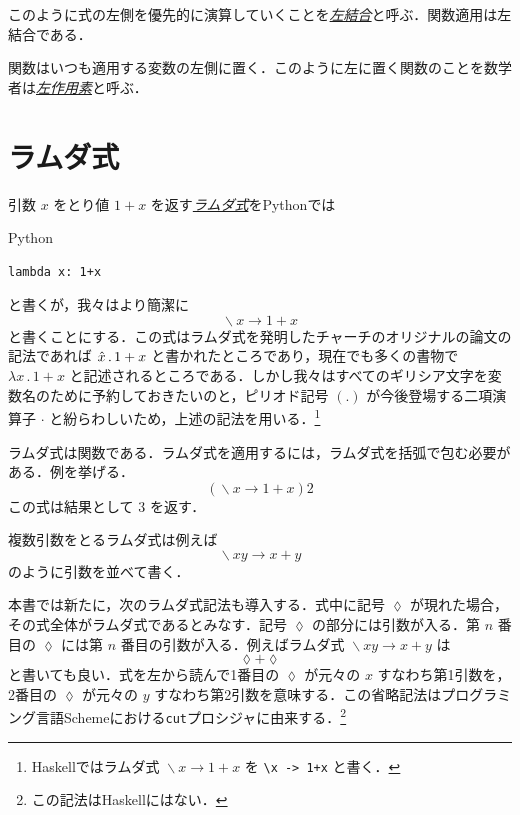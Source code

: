 \documentclass[a4paper]{jsbook}
\newcommand{\programminglanguage}[1]{\textsf{#1}}
\newcommand{\haskell}{\programminglanguage{Haskell}}
\newcommand{\python}{\programminglanguage{Python}}
\newcommand{\scheme}{\programminglanguage{Scheme}}
\newcommand{\keyword}[1]{{\underline{\emph{#1}}}}
\newcommand{\code}[1]{\texttt{#1}}
\newenvironment{pythoncode}{\begin{itembox}[r]{\python}}{\end{itembox}}
\newcommand{\mAnonParameter}{\lozenge}
\DeclareMathOperator{\mLambda}{\backslash}
\DeclareMathOperator{\mLambdaArrow}{\rightarrow}
\newcommand{\mLambdaExp}[2]{\mLambda{#1}\mLambdaArrow{#2}}
\begin{document}
このように式の左側を優先的に演算していくことを\keyword{左結合}と呼ぶ．関数適用は左結合である．

関数はいつも適用する変数の左側に置く．このように左に置く関数のことを数学者は\keyword{左作用素}と呼ぶ．

\section{ラムダ式}

引数 $x$ をとり値 $1+x$ を返す\keyword{ラムダ式}を\python では
\begin{pythoncode}
\begin{verbatim}
lambda x: 1+x
\end{verbatim}
\end{pythoncode}
と書くが，我々はより簡潔に
\begin{equation}
\mLambdaExp{x}{1+x}
\end{equation}
と書くことにする．この式はラムダ式を発明したチャーチのオリジナルの論文の記法であれば $\Hat{x}\,.\,1+x$ と書かれたところであり，現在でも多くの書物で $\lambda x\,.\,1+x$ と記述されるところである．しかし我々はすべてのギリシア文字を変数名のために予約しておきたいのと，ピリオド記号 $(.)$ が今後登場する二項演算子 $\cdot$ と紛らわしいため，上述の記法を用いる．\footnote{\haskell ではラムダ式 $\mLambdaExp{x}{1+x}$ を \code{\textbackslash x -> 1+x} と書く．}

ラムダ式は関数である．ラムダ式を適用するには，ラムダ式を括弧で包む必要がある．例を挙げる．
\begin{equation}
(\mLambdaExp{x}{1+x})2
\end{equation}
この式は結果として $3$ を返す．

複数引数をとるラムダ式は例えば
\begin{equation}
\mLambdaExp{xy}{x+y}
\end{equation}
のように引数を並べて書く．

本書では新たに，次のラムダ式記法も導入する．式中に記号 $\mAnonParameter$ が現れた場合，その式全体がラムダ式であるとみなす．記号 $\mAnonParameter$ の部分には引数が入る．第 $n$ 番目の $\mAnonParameter$ には第 $n$ 番目の引数が入る．例えばラムダ式 $\mLambdaExp{xy}{x+y}$ は
\begin{equation}
\mAnonParameter+\mAnonParameter
\end{equation}
と書いても良い．式を左から読んで1番目の $\mAnonParameter$ が元々の $x$ すなわち第1引数を，2番目の $\mAnonParameter$ が元々の $y$ すなわち第2引数を意味する．この省略記法はプログラミング言語\scheme における\code{cut}プロシジャに由来する．\footnote{この記法は\haskell にはない．}
\end{document}
